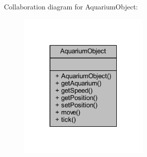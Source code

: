 Collaboration diagram for Aquarium\+Object\+:\nopagebreak
\begin{figure}[H]
\begin{center}
\leavevmode
\includegraphics[width=181pt]{class_aquarium_object__coll__graph}
\end{center}
\end{figure}
